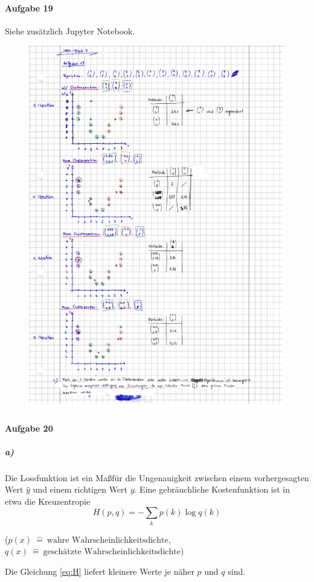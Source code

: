 \paragraph{Aufgabe 19}
Siehe zusätzlich Jupyter Notebook.
\FloatBarrier
\begin{figure}
  \centering
  \includegraphics[scale=0.8]{Aufgabe19/SMD_Blatt07.pdf}
\end{figure}
\FloatBarrier
\paragraph{Aufgabe 20}
\subparagraph{a)}
Die Lossfunktion ist ein Ma\ss für die Ungenauigkeit zwischen einem vorhergesagten Wert $\hat{y}$ und einem richtigen Wert $y$.
Eine gebräuchliche Kostenfunktion ist in etwa die Kreuzentropie
\begin{equation}
  H(p, q)=-\sum_k p(k) \log{q(k)} \label{eq:H}
\end{equation}
\begin{center}
 \tiny {($ p(x) \: \hat{=} \:\text{wahre Wahrscheinlichkeitsdichte}$, $ q(x) \: \hat{=} \:\text{geschätzte Wahrscheinlichkeitsdichte}$)}
\end{center}
Die Gleichung \eqref{eq:H} liefert kleinere Werte je näher $p$ und $q$ sind.

